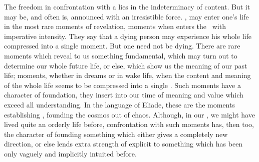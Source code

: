The freedom in confrontation with a  lies in the indeterminacy of
 content.  But it may be, and often is, announced with an
irresistible force.  \Oss,  may enter one's life in the most
rare moments of revelation, moments when  enters the \hoa\ with
imperative intensity.  They say that a dying person may experience his whole
life compressed into a single moment.  But one need not be dying.  There are
rare moments which reveal to us something fundamental,  which
may turn out to determine our whole future life, or else, which show us the
meaning of our past life; moments, whether in dreams or in wake life, when the
content and meaning of the whole life seems to be compressed into a single
.  Such moments have a character of foundation, they insert into our
time  of meaning and value which exceed all 
understanding.  In the language of Eliade, these are the moments establishing
, founding the cosmos out of chaos.  Although, in our
, we might have lived quite an orderly life before, confrontation
with such moments has, then too, the character of founding something which
either gives a completely new direction, or else lends extra strength of
explicit  to something which has been only vaguely and implicitly
intuited before.




